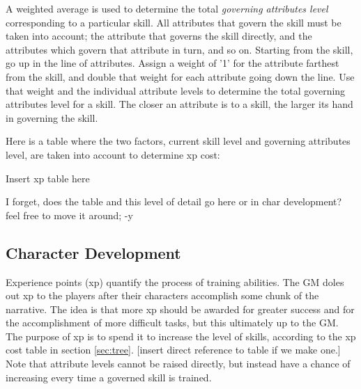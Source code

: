 \documentclass[12pt]{article}
\newcommand{\notes}[1]{{\color{Tan} #1}}
\begin{document}
A weighted average is used to determine the total \emph{governing attributes level} corresponding to a particular skill. All attributes that govern the skill must be taken into account; the attribute that governs the skill directly, and the attributes which govern that attribute in turn, and so on. Starting from the skill, go up in the line of attributes. Assign a weight of '1' for the attribute farthest from the skill, and double that weight for each attribute going down the line. Use that weight and the individual attribute levels to determine the total governing attributes level for a skill. The closer an attribute is to a skill, the larger its hand in governing the skill. 

Here is a table where the two factors, current skill level and governing attributes level, are taken into account to determine xp cost:

\notes{Insert xp table here}

\notes{I forget, does the table and this level of detail go here or in char development? feel free to move it around; -y}









\subsection{Character Development}\label{sec:dev}

Experience points (xp) quantify the process of training abilities.
The GM doles out xp to the players after their characters accomplish some chunk of the narrative.
The idea is that more xp should be awarded for greater success and for the accomplishment of more difficult tasks,
but this ultimately up to the GM.
The purpose of xp is to spend it to increase the level of skills, according to the xp cost table in section \ref{sec:tree}.
\notes{[insert direct reference to table if we make one.]}
Note that attribute levels cannot be raised directly, but instead have a chance of increasing every time a governed skill is trained.
\end{document}
